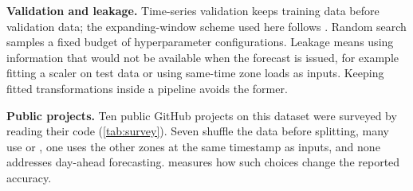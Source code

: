 \textbf{Validation and leakage.} Time-series validation keeps training data before validation data; the expanding-window scheme used here follows \cite{tscv}. Random search samples a fixed budget of hyperparameter configurations\cite{bergstra2012}. Leakage means using information that would not be available when the forecast is issued, for example fitting a scaler on test data or using same-time zone loads as inputs. Keeping fitted transformations inside a pipeline avoids the former\cite{pitfalls}.

\textbf{Public projects.} Ten public GitHub projects on this dataset were surveyed by reading their code (\cref{tab:survey}). Seven shuffle the data before splitting, many use  or , one uses the other zones at the same timestamp as inputs, and none addresses day-ahead forecasting.  measures how such choices change the reported accuracy.

